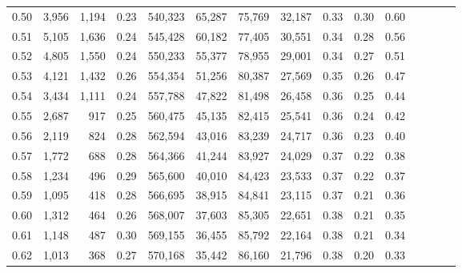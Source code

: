 \begin{tabular}{rrrcrrrrrrrrrrr}
0.50 &   3,956 &  1,194 &                                       0.23 &  540,323 &   65,287 &   75,769 &   32,187 &  0.33 &  0.30 &                         0.60 \\
0.51 &   5,105 &  1,636 &                                       0.24 &  545,428 &   60,182 &   77,405 &   30,551 &  0.34 &  0.28 &                         0.56 \\
0.52 &   4,805 &  1,550 &                                       0.24 &  550,233 &   55,377 &   78,955 &   29,001 &  0.34 &  0.27 &                         0.51 \\
0.53 &   4,121 &  1,432 &                                       0.26 &  554,354 &   51,256 &   80,387 &   27,569 &  0.35 &  0.26 &                         0.47 \\
0.54 &   3,434 &  1,111 &                                       0.24 &  557,788 &   47,822 &   81,498 &   26,458 &  0.36 &  0.25 &                         0.44 \\
0.55 &   2,687 &    917 &                                       0.25 &  560,475 &   45,135 &   82,415 &   25,541 &  0.36 &  0.24 &                         0.42 \\
0.56 &   2,119 &    824 &                                       0.28 &  562,594 &   43,016 &   83,239 &   24,717 &  0.36 &  0.23 &                         0.40 \\
0.57 &   1,772 &    688 &                                       0.28 &  564,366 &   41,244 &   83,927 &   24,029 &  0.37 &  0.22 &                         0.38 \\
0.58 &   1,234 &    496 &                                       0.29 &  565,600 &   40,010 &   84,423 &   23,533 &  0.37 &  0.22 &                         0.37 \\
0.59 &   1,095 &    418 &                                       0.28 &  566,695 &   38,915 &   84,841 &   23,115 &  0.37 &  0.21 &                         0.36 \\
0.60 &   1,312 &    464 &                                       0.26 &  568,007 &   37,603 &   85,305 &   22,651 &  0.38 &  0.21 &                         0.35 \\
0.61 &   1,148 &    487 &                                       0.30 &  569,155 &   36,455 &   85,792 &   22,164 &  0.38 &  0.21 &                         0.34 \\
0.62 &   1,013 &    368 &                                       0.27 &  570,168 &   35,442 &   86,160 &   21,796 &  0.38 &  0.20 &                         0.33 \\

\end{tabular}
